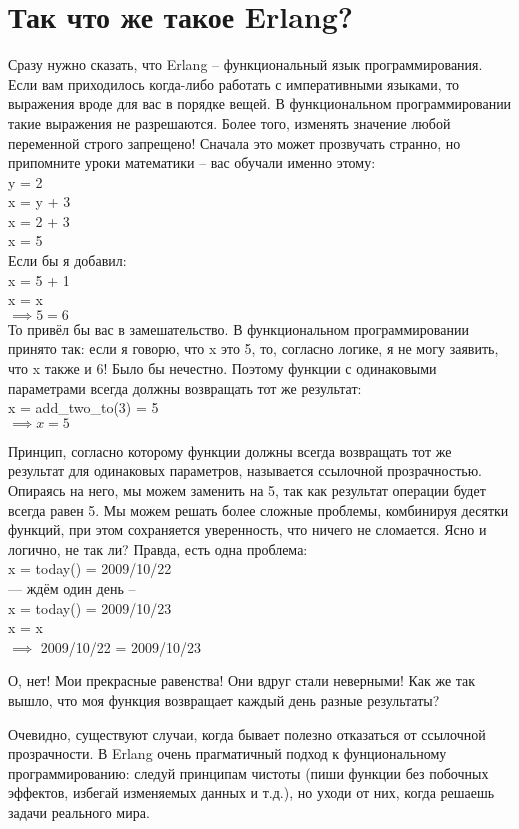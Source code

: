 \section{Так что же такое Erlang?}
Сразу нужно сказать, что Erlang \--- функциональный язык программирования.
Если вам приходилось когда\--либо работать с императивными языками, то выражения вроде  для вас в порядке вещей.
В функциональном программировании такие выражения не разрешаются.
Более того, изменять значение любой переменной строго запрещено!
Сначала это может прозвучать странно, но припомните уроки математики \--- вас обучали именно этому:\\ 
y = 2\\ 
x = y + 3\\ 
x = 2 + 3\\ 
x = 5\\ 
Если бы я добавил:\\ 
x = 5 + 1\\ 
x = x\\ 
$\implies 5 = 6$\\ 

То привёл бы вас в замешательство.
В функциональном программировании принято так: если я говорю, что x это 5, то, согласно логике, я не могу заявить, что x также и 6!
Было бы нечестно.
Поэтому функции с одинаковыми параметрами всегда должны возвращать тот же результат:\\  
x = add\_two\_to(3) = 5\\ 
$\implies x = 5$
 
Принцип, согласно которому функции должны всегда возвращать тот же результат для одинаковых параметров, называется ссылочной прозрачностью.
Опираясь на него, мы можем заменить  на 5, так как результат операции  будет всегда равен 5.
Мы можем решать более сложные проблемы, комбинируя десятки функций, при этом сохраняется уверенность, что ничего не сломается.
Ясно и логично, не так ли?
Правда, есть одна проблема:\\ 
x = today() = 2009/10/22\\ 
--- ждём один день --\\ 
x = today() = 2009/10/23\\ 
x = x\\ 
$\implies$ 2009/10/22 = 2009/10/23 

О, нет!
Мои прекрасные равенства!
Они вдруг стали неверными!
Как же так вышло, что моя функция возвращает каждый день разные результаты?

Очевидно, существуют случаи, когда бывает полезно отказаться от ссылочной прозрачности.
В Erlang очень прагматичный подход к фунциональному программированию: следуй принципам чистоты (пиши функции без побочных эффектов, избегай изменяемых данных и т.д.), но уходи от них, когда решаешь задачи реального мира.

